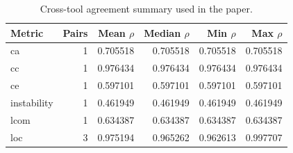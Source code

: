 \begin{table}[t]
\centering
\caption{Cross-tool agreement summary used in the paper.}
\label{tab:agreement-summary-auto}
\begin{tabular}{lrrrrr}
\toprule
Metric & Pairs & Mean $\rho$ & Median $\rho$ & Min $\rho$ & Max $\rho$ \\
\midrule
ca & 1 & 0.705518 & 0.705518 & 0.705518 & 0.705518 \\
cc & 1 & 0.976434 & 0.976434 & 0.976434 & 0.976434 \\
ce & 1 & 0.597101 & 0.597101 & 0.597101 & 0.597101 \\
instability & 1 & 0.461949 & 0.461949 & 0.461949 & 0.461949 \\
lcom & 1 & 0.634387 & 0.634387 & 0.634387 & 0.634387 \\
loc & 3 & 0.975194 & 0.965262 & 0.962613 & 0.997707 \\
\bottomrule
\end{tabular}
\end{table}
